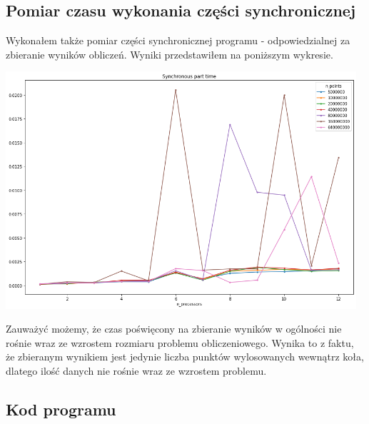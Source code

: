 \documentclass{article}
\begin{document}
        \subsection{Pomiar czasu wykonania części synchronicznej}
        Wykonałem także pomiar części synchronicznej programu - odpowiedzialnej za zbieranie wyników obliczeń. Wyniki przedstawiłem na poniższym wykresie. 
        \begin{center}
            \includegraphics[width=13cm]{report1/images/ex2_vcl_time_sync.png}
        \end{center}
        Zauważyć możemy, że czas poświęcony na zbieranie wyników w ogólności nie rośnie wraz ze wzrostem rozmiaru problemu obliczeniowego. Wynika to z faktu, że zbieranym wynikiem jest jedynie liczba punktów wylosowanych wewnątrz koła, dlatego ilość danych nie rośnie wraz ze wzrostem problemu. 

        \subsection{Kod programu}
        
        
\end{document}
